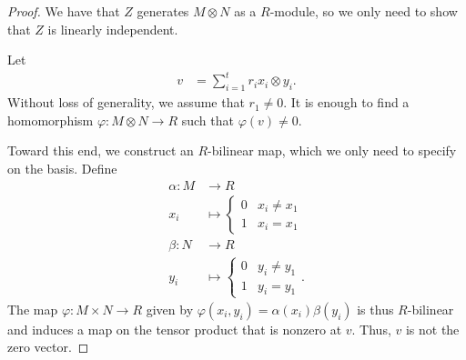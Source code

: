 \documentclass[10pt]{mypackage}
\begin{document}
\begin{proof}
    We have that $Z$ generates $M\otimes N$ as a $R$-module, so we only need to show that $Z$ is linearly independent.

    Let
    \begin{align*}
        v &= \sum_{i=1}^{t}r_ix_i\otimes y_i.
    \end{align*}
    Without loss of generality, we assume that $r_1\neq 0$. It is enough to find a homomorphism $\varphi\colon M\otimes N\rightarrow R$ such that $\varphi(v)\neq 0$.

    Toward this end, we construct an $R$-bilinear map, which we only need to specify on the basis. Define
    \begin{align*}
	\alpha\colon M&\rightarrow R\\
	x_i &\mapsto \begin{cases}
		0 & x_i\neq x_1 \\
		1 & x_i = x_1
        \end{cases}\\
    \beta\colon N&\rightarrow R\\
    y_i &\mapsto \begin{cases}
	0 & y_i\neq y_1\\
	1 & y_i = y_1
    \end{cases}.
    \end{align*}
    The map $\varphi\colon M\times N\rightarrow R$ given by $\varphi \left( x_i, y_i \right) = \alpha \left( x_i \right) \beta \left( y_i \right)$ is thus $R$-bilinear and induces a map on the tensor product that is nonzero at $v$. Thus, $v$ is not the zero vector.
\end{proof}
\end{document}

